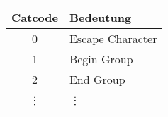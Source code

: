 \documentclass{standalone}
\begin{document}
\begin{tabular}{cl}
	\toprule
		Catcode & Bedeutung        \\
	\midrule
		0       & Escape Character \\
		1       & Begin Group      \\
		2       & End Group        \\
		\vdots  & \quad \vdots     \\
	\bottomrule
\end{tabular}
\end{document}
